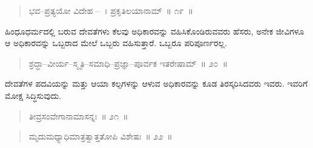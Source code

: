 \vspace{-0.1cm}

\begin{verse}
ಭವ–ಪ್ರತ್ಯಯೋ ವಿದೇಹ –~। ಪ್ರಕೃತಿಲಯಾನಾಮ್​~॥ ೧೯~॥
\end{verse}

\vspace{-0.4cm}


\vspace{0.2cm}

ಹಿಂಧೂಧರ್ಮದಲ್ಲಿ ಬರುವ ದೇವತೆಗಳು ಕೆಲವು ಅಧಿಕಾರವನ್ನು ವಹಿಸಿಕೊಂಡಿರುವ\break ವರು ಹೆಸರು, ಅನೇಕ ಜೀವಿಗಳೂ ಆ ಅಧಿಕಾರವನ್ನು ಒಬ್ಬರಾದ ಮೇಲೆ ಒಬ್ಬರು ವಹಿಸುತ್ತಾರೆ. ಒಬ್ಬರೂ ಪರಿಪೂರ್ಣರಲ್ಲ. 

\newpage


\begin{verse}
ಶ್ರದ್ಧಾ–ವೀರ್ಯ–ಸ್ಮೃತಿ–ಸಮಾಧಿ–ಪ್ರಜ್ಞಾ–ಪೂರ್ವಕ ಇತರೇಷಾಮ್​~॥ ೨೦~॥
\end{verse}

\vspace{-0.4cm}


\vspace{0.1cm}

ದೇವತೆಗಳ ಪದವಿಯನ್ನು ಮತ್ತು ಆಯಾ ಕಲ್ಪಗಳನ್ನು ಆಳುವ ಅಧಿಕಾರವನ್ನು ಕೂಡ ತಿರಸ್ಕರಿಸಿದವರು ಇವರು. ಇವರಿಗೆ ಮೋಕ್ಷ ಸಿದ್ಧಿಸುವುದು. 

\vspace{-0.1cm}

\begin{verse}
ತೀವ್ರಸಂವೇಗಾನಾಮಾಸನ್ನಃ~॥ ೨೧~॥
\end{verse}

\vspace{-0.4cm}


\vspace{-0.1cm}

\begin{verse}
ಮೃದುಮಧ್ಯಾಧಿಮಾತ್ರತ್ವಾತ್ತತೋಪಿ ವಿಶೇಷಃ~॥ ೨೨~॥
\end{verse}

\vspace{-0.4cm}


\vspace{-0.1cm}

